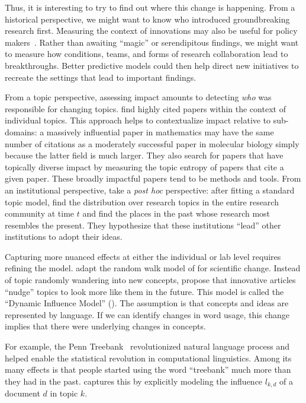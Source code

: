 Thus, it is interesting to try to find out where this change is happening.  From
a historical perspective, we might want to know who introduced
groundbreaking research first.  Measuring the context of innovations may also be useful for policy makers~\citep{largent-12}.
Rather than awaiting ``magic'' or serendipitous findings, we might want to measure
how conditions, teams, and forms of research collaboration lead to breakthroughs.
Better predictive models could then help direct new initiatives to recreate the settings that lead to important findings.

From a topic perspective, assessing impact amounts to detecting \emph{who} was responsible
for changing topics.
\citet{mann-06} find highly cited papers within the context of individual topics.
This approach helps to contextualize impact relative to sub-domains: a massively influential paper in mathematics may have the same number of citations as a moderately successful paper in molecular biology simply because the latter field is much larger.
They also search for papers that have topically diverse impact by measuring the topic entropy of papers that cite a given paper.
These broadly impactful papers tend to be methods and tools.
From an institutional perspective, \citet{ramage-10} take
a \textit{post hoc} perspective: after fitting a standard  topic model,
find the distribution over research topics in the entire research community at
time $t$ and find the places in the past whose research most resembles the present.  They hypothesize that these institutions ``lead'' other institutions to adopt
their ideas. %

Capturing more nuanced effects at either the individual or lab level requires
refining the model.  \citet{gerrish-10} adapt the random walk model of
\citet{wang-08} for scientific change.  Instead of topic randomly wandering into
new concepts, \citet{gerrish-10} propose that innovative articles ``nudge'' topics
to look more like them in the future.  This model is called the ``Dynamic
Influence Model'' (). The assumption is that concepts and ideas are represented
by language. If we can identify changes in word usage, this change implies that there
were underlying changes in concepts.

For example, the Penn Treebank~\citep{marcus-93} revolutionized natural language
process and helped enable the statistical revolution in computational
linguistics.  Among its many effects is that people started using the word
``treebank'' much more than they had in the past.   captures this by
explicitly modeling the influence $l_{k,d}$ of a document $d$ in topic
$k$.


